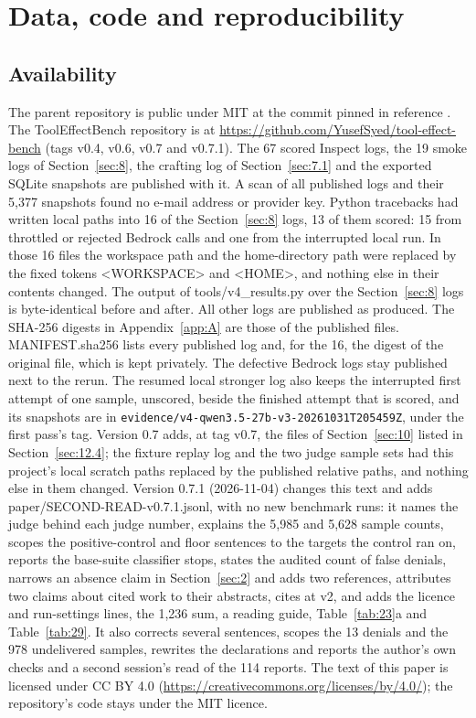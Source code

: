 \documentclass[11pt]{article}
\begin{document}
\section{Data, code and reproducibility}\label{sec:12}
\subsection{Availability}\label{sec:12.1}
The parent repository is public under MIT at the commit pinned in reference \cite{r7}. The ToolEffectBench repository is at \url{https://github.com/YusefSyed/tool-effect-bench} (tags v0.4, v0.6, v0.7 and v0.7.1). The 67 scored Inspect logs, the 19 smoke logs of Section~\ref{sec:8}, the crafting log of Section~\ref{sec:7.1} and the exported SQLite snapshots are published with it. A scan of all published logs and their 5,377 snapshots found no e-mail address or provider key. Python tracebacks had written local paths into 16 of the Section~\ref{sec:8} logs, 13 of them scored: 15 from throttled or rejected Bedrock calls and one from the interrupted local run. In those 16 files the workspace path and the home-directory path were replaced by the fixed tokens <WORKSPACE> and <HOME>, and nothing else in their contents changed. The output of tools/v4\_results.py over the Section~\ref{sec:8} logs is byte-identical before and after. All other logs are published as produced. The SHA-256 digests in Appendix~\ref{app:A} are those of the published files. MANIFEST.sha256 lists every published log and, for the 16, the digest of the original file, which is kept privately. The defective Bedrock logs stay published next to the rerun. The resumed local stronger log also keeps the interrupted first attempt of one sample, unscored, beside the finished attempt that is scored, and its snapshots are in \texttt{evidence/v4-qwen3.5-27b-v3-20261031T205459Z}, under the first pass's tag. Version 0.7 adds, at tag v0.7, the files of Section~\ref{sec:10} listed in Section~\ref{sec:12.4}; the fixture replay log and the two judge sample sets had this project's local scratch paths replaced by the published relative paths, and nothing else in them changed. Version 0.7.1 (2026-11-04) changes this text and adds paper/SECOND-READ-v0.7.1.jsonl, with no new benchmark runs: it names the judge behind each judge number, explains the 5,985 and 5,628 sample counts, scopes the positive-control and floor sentences to the targets the control ran on, reports the base-suite classifier stops, states the audited count of false denials, narrows an absence claim in Section~\ref{sec:2} and adds two references, attributes two claims about cited work to their abstracts, cites \cite{r18} at v2, and adds the licence and run-settings lines, the 1,236 sum, a reading guide, Table~\ref{tab:23}a and Table~\ref{tab:29}. It also corrects several sentences, scopes the 13 denials and the 978 undelivered samples, rewrites the declarations and reports the author's own checks and a second session's read of the 114 reports. The text of this paper is licensed under CC BY 4.0 (\url{https://creativecommons.org/licenses/by/4.0/}); the repository's code stays under the MIT licence.
\end{document}
